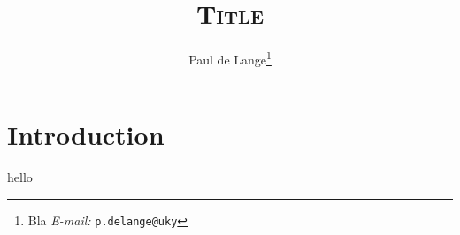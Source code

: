 \documentclass[11pt,oneside]{article}
\makeatletter
\newcommand{\titleOfAll}{Title}
\newcommand{\nameOfAuthor}{Paul de Lange}
\newcommand{\emailOfAuthor}{p.delange@uky}
\newcommand{\insitutionOfAuthor}{Bla}
\theoremstyle{definition}
\theoremstyle{remark}
\numberwithin{equation}{section}
\makeatother
\begin{document}

\title{
\vspace{-35pt}
\textsc{\titleOfAll}
}
\renewcommand{\thefootnote}{\fnsymbol{footnote}} 
   
\renewcommand{\thefootnote}{\arabic{footnote}} 

\author{
	\nameOfAuthor\footnote{
	\insitutionOfAuthor
	\newline\indent\indent
	{\em E-mail:} {\tt \emailOfAuthor}
	}
}

\maketitle
{}



\clearpage

\tableofcontents

\clearpage

\section{Introduction}

hello
\end{document}
